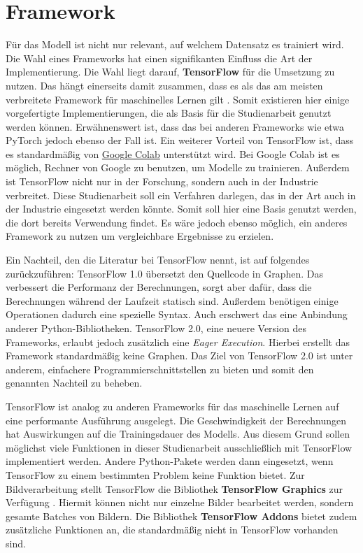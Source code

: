 \section{Framework}

Für das Modell ist nicht nur relevant, auf welchem Datensatz es trainiert wird. Die Wahl eines Frameworks hat einen signifikanten Einfluss die Art der Implementierung. Die Wahl liegt darauf, \textbf{TensorFlow} für die Umsetzung zu nutzen. Das hängt einerseits damit zusammen, dass es als das am meisten verbreitete Framework für maschinelles Lernen gilt \cite{frameworks}. Somit existieren hier einige vorgefertigte Implementierungen, die als Basis für die Studienarbeit genutzt werden können. Erwähnenswert ist, dass das bei anderen Frameworks wie etwa PyTorch jedoch ebenso der Fall ist. Ein weiterer Vorteil von TensorFlow ist, dass es standardmäßig von \href{https://colab.research.google.com/}{Google Colab} unterstützt wird. Bei Google Colab ist es möglich, Rechner von Google zu benutzen, um Modelle zu trainieren. Außerdem ist TensorFlow nicht nur in der Forschung, sondern auch in der Industrie verbreitet. Diese Studienarbeit soll ein Verfahren darlegen, das in der Art auch in der Industrie eingesetzt werden könnte. Somit soll hier eine Basis genutzt werden, die dort bereits Verwendung findet. Es wäre jedoch ebenso möglich, ein anderes Framework zu nutzen um vergleichbare Ergebnisse zu erzielen.

Ein Nachteil, den die Literatur bei TensorFlow nennt, ist auf folgendes zurückzuführen: TensorFlow 1.0 übersetzt den Quellcode in Graphen. Das verbessert die Performanz der Berechnungen, sorgt aber dafür, dass die Berechnungen während der Laufzeit statisch sind. Außerdem benötigen einige Operationen dadurch eine spezielle Syntax. Auch erschwert das eine Anbindung anderer Python-Bibliotheken.  TensorFlow 2.0, eine neuere Version des Frameworks, erlaubt jedoch zusätzlich eine \emph{Eager Execution}. Hierbei erstellt das Framework standardmäßig keine Graphen. Das Ziel von TensorFlow 2.0 ist unter anderem, einfachere Programmierschnittstellen zu bieten und somit den genannten Nachteil zu beheben. \cite{learn-tensorflow} 

TensorFlow ist analog zu anderen Frameworks für das maschinelle Lernen auf eine performante Ausführung ausgelegt. Die Geschwindigkeit der Berechnungen hat Auswirkungen auf die Trainingsdauer des Modells. Aus diesem Grund sollen möglichst viele Funktionen in dieser Studienarbeit ausschließlich mit TensorFlow implementiert werden. Andere Python-Pakete werden dann eingesetzt, wenn TensorFlow zu einem bestimmten Problem keine Funktion bietet. Zur Bildverarbeitung stellt TensorFlow die Bibliothek \textbf{TensorFlow Graphics} zur Verfügung \cite{tensorflow-graphics}. Hiermit können nicht nur einzelne Bilder bearbeitet werden, sondern gesamte Batches von Bildern. Die Bibliothek \textbf{TensorFlow Addons} bietet zudem zusätzliche Funktionen an, die standardmäßig nicht in TensorFlow vorhanden sind.

